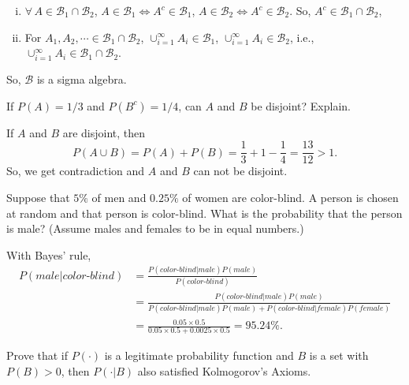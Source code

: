 \documentclass[12pt]{elegantbook}
\begin{document}
\begin{solution}
\begin{enumerate}[(a)]
\begin{enumerate}[(i)]
                \item $\forall\,A\in\mathcal{B}_1\cap\mathcal{B}_2$, $A\in\mathcal{B}_1\Leftrightarrow A^c\in\mathcal{B}_1$, $A\in\mathcal{B}_2\Leftrightarrow A^c\in\mathcal{B}_2$. So, $A^c\in\mathcal{B}_1\cap\mathcal{B}_2$, 
                \item For $A_1, A_2, \cdots \in\mathcal{B}_1\cap\mathcal{B}_2$, $\cup_{i=1}^\infty A_i\in\mathcal{B}_1$, $\cup_{i=1}^\infty A_i\in\mathcal{B}_2$, i.e., $\cup_{i=1}^\infty A_i\in\mathcal{B}_1\cap\mathcal{B}_2$. 
            \end{enumerate}
            So, $\mathcal{B}$ is a sigma algebra. 
        \end{enumerate}
    \end{solution}

    \setcounter{exer}{12}
    \begin{exercise}
        If $P(A)=1/3$ and $P(B^c)=1/4$, can $A$ and $B$ be disjoint? Explain. 
    \end{exercise}

    \begin{solution}
        If $A$ and $B$ are disjoint, then
        \[P(A\cup B)=P(A)+P(B)=\frac{1}{3}+1-\frac{1}{4}=\frac{13}{12}>1. \]
        So, we get contradiction and $A$ and $B$ can not be disjoint. 
    \end{solution}

    \setcounter{exer}{32}
    \begin{exercise}
        Suppose that $5\%$ of men and $0.25\%$ of women are color-blind. A person is chosen at random and that person is color-blind. What is the probability that the person is male? (Assume males and females to be in equal numbers.)
    \end{exercise}

    \begin{solution}
        With Bayes' rule, 
        \begin{align*}
            P(male|color\text{-}blind)&=\frac{P(color\text{-}blind|male)P(male)}{P(color\text{-}blind)}\\
            &=\frac{P(color\text{-}blind|male)P(male)}{P(color\text{-}blind|male)P(male)+P(color\text{-}blind|female)P(female)}\\
            &=\frac{0.05\times0.5}{0.05\times0.5+0.0025\times0.5}=95.24\%.
        \end{align*}
    \end{solution}

    \setcounter{exer}{34}
    \begin{exercise}
        Prove that if $P(\cdot)$ is a legitimate probability function and $B$ is a set with $P(B)>0$, then $P(\cdot|B)$ also satisfied Kolmogorov's Axioms. 
    \end{exercise}
\end{document}
